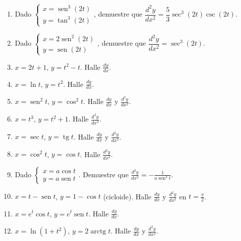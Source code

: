 \documentclass[12pt, letterpaper]{article}
\begin{document}
\begin{enumerate}[leftmargin=*]
  \item \dificil{} Dado $\begin{cases} x = \operatorname{sen}^3(2t) \\ y = \tan^3(2t) \end{cases}$, demuestre que $\dfrac{d^2y}{dx^2} = \dfrac{5}{3}\sec^3(2t)\csc(2t)$. %

  \item \dificil{} Dado $\begin{cases} x = 2\operatorname{sen}^2(2t) \\ y = \operatorname{sen}(2t) \end{cases}$, demuestre que $\dfrac{d^2y}{dx^2} = \sec^3(2t)$. %

  \item \dificil{} $x = 2t + 1$, $y = t^2 - t$. Halle $\frac{dy}{dx}$.

  \item \dificil{} $x = \ln t$, $y = t^2$. Halle $\frac{dy}{dx}$.

  \item \dificil{} $x = \operatorname{sen}^2 t$, $y = \cos^2 t$. Halle $\frac{dy}{dx}$ y $\frac{d^2y}{dx^2}$.

  \item \dificil{} $x = t^3$, $y = t^2 + 1$. Halle $\frac{d^2y}{dx^2}$.

  \item \muyDificil{} $x = \sec t$, $y = \operatorname{tg} t$. Halle $\frac{dy}{dx}$ y $\frac{d^2y}{dx^2}$.

  \item \muyDificil{} $x = \cos^2 t$, $y = \cos t$. Halle $\frac{d^2y}{dx^2}$.

  \item \muyDificil{} Dado $\begin{cases} x = a\cos t \\ y = a\operatorname{sen} t \end{cases}$. Demuestre que $\frac{d^2y}{dx^2} = -\frac{1}{a\operatorname{sen}^3 t}$.

  \item \muyDificil{} $x = t - \operatorname{sen} t$, $y = 1 - \cos t$ (cicloide). Halle $\frac{dy}{dx}$ y $\frac{d^2y}{dx^2}$ en $t = \frac{\pi}{2}$.

  \item \muyDificil{} $x = e^t\cos t$, $y = e^t\operatorname{sen} t$. Halle $\frac{dy}{dx}$.

  \item \muyDificil{} $x = \ln(1+t^2)$, $y = 2\operatorname{arctg} t$. Halle $\frac{dy}{dx}$ y $\frac{d^2y}{dx^2}$.


\end{enumerate}
\end{document}
